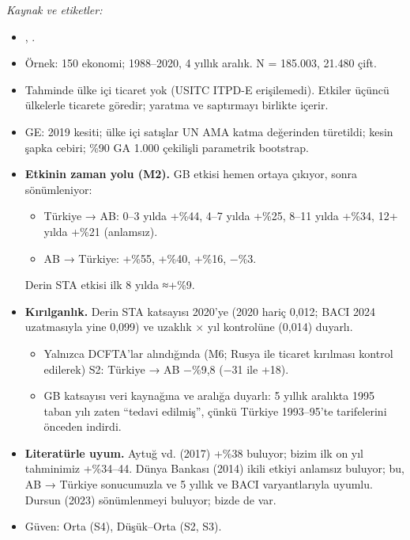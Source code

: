 \endgroup

\emph{Kaynak ve etiketler:}

\begin{itemize}
\item
  \etiketT{} , .
\item
  Örnek: 150 ekonomi; 1988--2020, 4 yıllık aralık. N = 185.003, 21.480 çift.
\item
  Tahminde ülke içi ticaret yok (USITC ITPD-E erişilemedi). Etkiler üçüncü ülkelerle ticarete göredir; yaratma ve saptırmayı birlikte içerir.
\item
  GE: 2019 kesiti; ülke içi satışlar UN AMA katma değerinden türetildi; kesin şapka cebiri; \%90 GA 1.000 çekilişli parametrik bootstrap.
\item
  \textbf{Etkinin zaman yolu (M2).} GB etkisi hemen ortaya çıkıyor, sonra sönümleniyor:

  \begin{itemize}
  \tightlist
  \item
    Türkiye → AB: 0--3 yılda +\%44, 4--7 yılda +\%25, 8--11 yılda +\%34, 12+ yılda +\%21 (anlamsız).
  \item
    AB → Türkiye: +\%55, +\%40, +\%16, −\%3.
  \end{itemize}

  Derin STA etkisi ilk 8 yılda ≈+\%9.
\item
  \textbf{Kırılganlık.} Derin STA katsayısı 2020'ye (2020 hariç 0,012; BACI 2024 uzatmasıyla yine 0,099) ve uzaklık × yıl kontrolüne (0,014) duyarlı.

  \begin{itemize}
  \tightlist
  \item
    Yalnızca DCFTA'lar alındığında (M6; Rusya ile ticaret kırılması kontrol edilerek) S2: Türkiye → AB −\%9,8 (−31 ile +18).
  \item
    GB katsayısı veri kaynağına ve aralığa duyarlı: 5 yıllık aralıkta 1995 taban yılı zaten ``tedavi edilmiş'', çünkü Türkiye 1993--95'te tarifelerini önceden indirdi.
  \end{itemize}
\item
  \textbf{Literatürle uyum.} Aytuğ vd. (2017) +\%38 buluyor; bizim ilk on yıl tahminimiz +\%34--44. Dünya Bankası (2014) ikili etkiyi anlamsız buluyor; bu, AB → Türkiye sonucumuzla ve 5 yıllık ve BACI varyantlarıyla uyumlu. Dursun (2023) sönümlenmeyi buluyor; bizde de var.
\item
  Güven: Orta (S4), Düşük--Orta (S2, S3).
\end{itemize}

